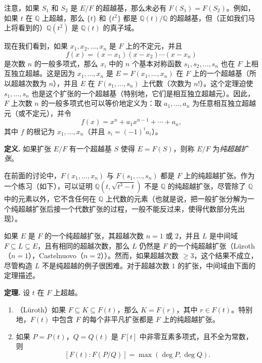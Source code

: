 注意，如果 $S_1$ 和 $S_2$ 是 $E/F$ 的超越基，那么未必有 $F(S_1)=F(S_2)$。例如，如果 $t$ 在 $\mathbb Q$ 上超越，那么 $\{t\}$ 和 $\{t^2\}$ 都是 $\mathbb Q(t)/\mathbb Q$ 的超越基，但（正如我们马上将看到的）$\mathbb Q(t^2)$ 是 $\mathbb Q(t)$ 的真子域。

现在我们看到，如果 $x_1,x_2,\ldots,x_n$ 是 $F$ 上的不定元，并且
\begin{equation}
 f(x)=(x-x_1)(x-x_2)\cdots (x-x_n) \tag{14.28}
\end{equation}
是次数 $n$ 的一般多项式，那么 $x_i$ 中的 $n$ 个基本对称函数 $s_1,s_2,\ldots,s_n$ 也在 $F$ 上相互独立超越。这是因为 $x_1,\ldots,x_n$ 是 $E=F(x_1,\ldots,x_n)$ 在 $F$ 上的一个超越基（所以超越次数为 $n$），并且 $E$ 在 $F(s_1,\ldots,s_n)$ 上代数（次数为 $n!$）。这个定理迫使 $s_1,\ldots,s_n$ 也是这个扩张的一个超越基（特别地，它们是相互独立超越元）。因此，$F$ 上次数 $n$ 的一般多项式也可以等价地定义为：取 $a_1,\ldots,a_n$ 为任意相互独立超越元（或不定元），并令
\begin{equation}
 f(x)=x^n+a_1x^{n-1}+\cdots+a_n, \tag{14.29}
\end{equation}
其中 $f$ 的根记为 $x_1,\ldots,x_n$（并且 $s_i=(-1)^ia_i$）。

\noindent\textbf{定义.} 如果扩张 $E/F$ 有一个超越基 $S$ 使得 $E=F(S)$，则称 $E/F$ 为\emph{纯超越扩张}。

在前面的讨论中，$F(x_1,\ldots,x_n)$ 与 $F(s_1,\ldots,s_n)$ 都是 $F$ 上的纯超越扩张。作为一个练习（如下），可以证明 $\mathbb Q(t,\sqrt{t^3-t})$ 不是 $\mathbb Q$ 的纯超越扩张，尽管除了 $\mathbb Q$ 中的元素以外，它不含任何在 $\mathbb Q$ 上代数的元素（也就是说，把一般扩张分解为一个纯超越扩张后接一个代数扩张的过程，一般不能反过来，使得代数部分先出现）。

如果 $E$ 是 $F$ 的一个纯超越扩张，其超越次数 $n=1$ 或 $2$，并且 $L$ 是中间域 $F\subseteq L\subseteq E$，且有相同的超越次数，那么 $L$ 仍然是 $F$ 的一个纯超越扩张（Lüroth（$n=1$），Castelnuovo（$n=2$））。然而，如果超越次数 $\geq 3$，这个结果不成立，尽管构造 $L$ 不是纯超越的例子很困难。对于超越次数 $1$ 的扩张，中间域由下面的定理描述。

\noindent\textbf{定理.} 设 $t$ 在 $F$ 上超越。
\begin{enumerate}[label=(\arabic*)]
\item （Lüroth）如果 $F\subseteq K\subseteq F(t)$，那么 $K=F(r)$，其中 $r\in F(t)$。特别地，$F(t)$ 中包含 $F$ 的每个非平凡扩张都是 $F$ 上的纯超越扩张。
\item 如果 $P=P(t)$，$Q=Q(t)$ 是 $F[t]$ 中非零互素多项式，且不全为常数，则
\[
 [F(t):F(P/Q)]=\max(\deg P,\deg Q).
\]
\end{enumerate}

